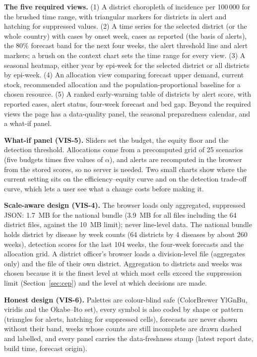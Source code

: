 \documentclass[conference]{IEEEtran}
\begin{document}
\textbf{The five required views.} (1) A district choropleth of incidence per 100\,000 for the brushed time range, with triangular markers for districts in alert and hatching for suppressed values. (2) A time series for the selected district (or the whole country) with cases by onset week, cases as reported (the basis of alerts), the 80\% forecast band for the next four weeks, the alert threshold line and alert markers; a brush on the context chart sets the time range for every view. (3) A seasonal heatmap, either year by epi-week for the selected district or all districts by epi-week. (4) An allocation view comparing forecast upper demand, current stock, recommended allocation and the population-proportional baseline for a chosen resource. (5) A ranked early-warning table of districts by alert score, with reported cases, alert status, four-week forecast and bed gap. Beyond the required views the page has a data-quality panel, the seasonal preparedness calendar, and a what-if panel.

\textbf{What-if panel (VIS-5).} Sliders set the budget, the equity floor and the detection threshold. Allocations come from a precomputed grid of 25 scenarios (five budgets times five values of $\alpha$), and alerts are recomputed in the browser from the stored scores, so no server is needed. Two small charts show where the current setting sits on the efficiency--equity curve and on the detection trade-off curve, which lets a user see what a change costs before making it.

\textbf{Scale-aware design (VIS-4).} The browser loads only aggregated, suppressed JSON: 1.7~MB for the national bundle (3.9~MB for all files including the 64 district files, against the 10~MB limit); never line-level data. The national bundle holds district by disease by week counts (64 districts by 4 diseases by about 260 weeks), detection scores for the last 104 weeks, the four-week forecasts and the allocation grid. A district officer's browser loads a division-level file (aggregates only) and the file of their own district. Aggregation to districts and weeks was chosen because it is the finest level at which most cells exceed the suppression limit (Section~\ref{sec:cep}) and the level at which decisions are made.

\textbf{Honest design (VIS-6).} Palettes are colour-blind safe (ColorBrewer YlGnBu, viridis and the Okabe--Ito set), every symbol is also coded by shape or pattern (triangles for alerts, hatching for suppressed cells), forecasts are never shown without their band, weeks whose counts are still incomplete are drawn dashed and labelled, and every panel carries the data-freshness stamp (latest report date, build time, forecast origin).
\end{document}
